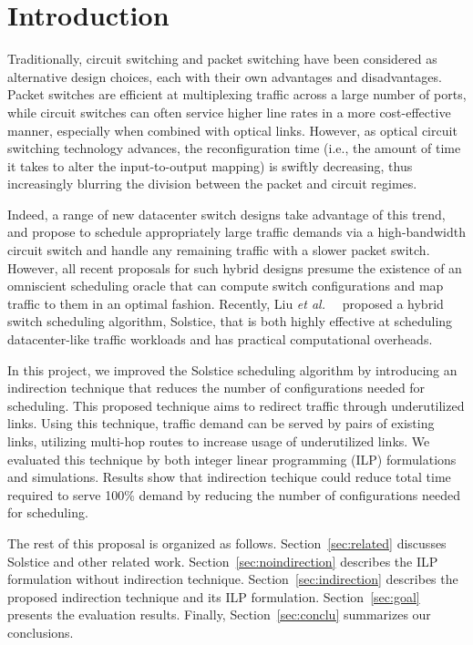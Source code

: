 \section{Introduction}

Traditionally, circuit switching and packet switching have been
considered as alternative design choices, each with their own advantages
and disadvantages. Packet switches are efficient at multiplexing traffic
across a large number of ports, while circuit switches can often service
higher line rates in a more cost-effective manner, especially when
combined with optical links. However, as optical circuit switching
technology advances, the reconfiguration time (i.e., the amount of time
it takes to alter the input-to-output mapping) is swiftly decreasing,
thus increasingly blurring the division between the packet and circuit
regimes.

Indeed, a range of new datacenter switch designs take advantage of this
trend, and propose to schedule appropriately large traffic demands via a
high-bandwidth circuit switch and handle any remaining traffic with a
slower packet switch. However, all recent proposals for such hybrid
designs presume the existence of an omniscient scheduling oracle that
can compute switch configurations and map traffic to them in an optimal
fashion. Recently, Liu \textit{et al.\ }~\cite{Liu:2015} proposed a
hybrid switch scheduling algorithm, Solstice, that is both
highly effective at scheduling datacenter-like traffic workloads and has
practical computational overheads.

In this project, we improved the Solstice scheduling algorithm by
introducing an indirection technique that reduces the number of
configurations needed for scheduling. This proposed technique
aims to redirect traffic through underutilized links. Using this technique,
traffic demand can be served by pairs of existing links, utilizing
multi-hop routes to increase usage of underutilized links.
We evaluated this technique by both integer linear programming (ILP)
formulations and simulations. Results show that indirection techique could
reduce total time required to serve 100\% demand by reducing the number
of configurations needed for scheduling.

The rest of this proposal is organized as follows.
Section~\ref{sec:related} discusses Solstice and other related work.
Section~\ref{sec:noindirection} describes the ILP formulation without
indirection technique.
Section~\ref{sec:indirection} describes the proposed indirection
technique and its ILP formulation. Section~\ref{sec:goal} presents the
evaluation results. Finally, Section~\ref{sec:conclu} summarizes our conclusions.

